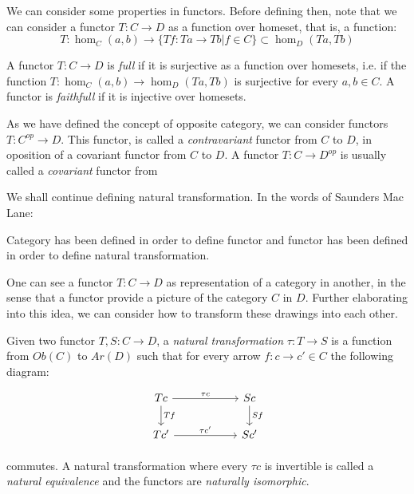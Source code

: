 We can consider some properties in functors. Before defining then, note that we can consider a functor $T:C\to D$ as a function over homeset, that is, a function: 
$$T:\hom_C(a,b) \to \{Tf: Ta \to Tb | f \in C\} \subset \hom_D(Ta,Tb)$$

\begin{definition}
  A functor $T:C\to D$ is \emph{full} if it is surjective as a function over homesets, i.e. if the function $T:\hom_C(a,b) \to  \hom_D(Ta,Tb)$  is surjective for every $a,b \in C$. A functor is \emph{faithfull} if it is injective over homesets.
\end{definition}

As we have defined the concept of opposite category, we can consider functors $T:C^{op} \to D$. This functor, is called a \emph{contravariant} functor from $C$ to $D$, in oposition of a covariant functor from $C$ to $D$. A functor $T: C \to D^{op}$ is usually called a \emph{covariant} functor from 



We shall continue defining natural transformation. In the words of Saunders Mac Lane:

\begin{displayquote}
Category has been defined in order to define functor and functor has been defined in order to define natural transformation.
\end{displayquote}




One can see a functor $T:C\to D$ as representation of a category in another, in the sense that a functor provide a picture of the category $C$ in $D$. Further elaborating into this idea, we can consider how to transform these drawings into each other. 

\begin{definition}
  Given two functor $T,S:C\to D$, a \emph{natural transformation} $\tau : T \to S$ is a function from $Ob(C)$ to $Ar(D)$ such that for every arrow $f:c \to c' \in C$ the following diagram:
\[
  \begin{tikzpicture}
  \node {\begin{tikzcd}[column sep=20mm]
      Tc\ar[r,"\tau c"]\ar[d,"Tf"] & Sc\ar[d,"Sf"]\\
      Tc'\ar[r,"\tau c'"] & Sc'
  \end{tikzcd}};
\end{tikzpicture}
\]

commutes. A natural transformation where every $\tau c$ is invertible is called a \emph{natural equivalence} and the functors are \emph{naturally isomorphic}.
  \end{definition}


